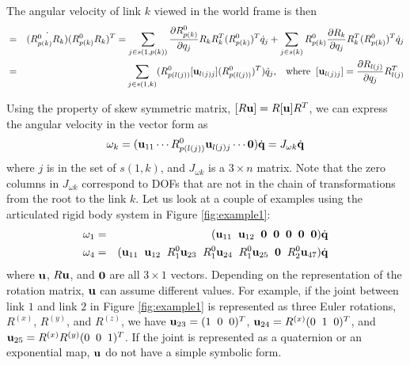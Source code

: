 The angular velocity of link $k$ viewed in the world frame is then
\begin{eqnarray}
[\omega_k] & = & \dot{(R^0_{p(k)}R_k)} (R^0_{p(k)}R_k)^T = \sum_{j \in s(1,p(k))}
\frac{\partial R^0_{p(k)}}{\partial q_j} R_k R_k^T (R^0_{p(k)})^T
\dot{q}_j + \sum_{j \in s(k)} R^0_{p(k)} \frac{\partial R_k}{\partial q_j} R_k^T
(R^0_{p(k)})^T \dot{q}_j  \nonumber \\
& = & \sum_{j \in s(1,k)} (R^0_{p(l(j))} [\vc{u}_{l(j)j}] (R^0_{p(l(j))})^T) \dot{q}_j, \;\;\;\mathrm{where}\;\;
[\vc{u}_{l(j)j}] = \frac{\partial R_{l(j)}}{\partial q_j} R_{l(j)}^T
\end{eqnarray}

Using the property of skew symmetric matrix, $[R \mathbf{u}] = R [\mathbf{u}]
R^T$, we can express the angular velocity in the vector form as
\begin{equation}
\label{eqn:angular_velocity}
\omega_k = (\mathbf{u}_{11} \cdots R^0_{p(l(j))} \mathbf{u}_{l(j)j} \cdots \mathbf{0}) \dot{\mathbf{q}} = J_{\omega k} \dot{\mathbf{q}}
\end{equation}
where $j$ is in the set of $s(1,k)$, and $J_{\omega k}$ is a $3 \times
n$ matrix. Note that the zero columns in $J_{\omega k}$ correspond to
DOFs that are not in the chain of transformations from the root to the
link $k$. Let us look at a couple of examples using the articulated
rigid body system in Figure \ref{fig:example1}:
\begin{eqnarray}
\omega_1 &=& (\mathbf{u}_{11} \;\; \mathbf{u}_{12} \;\; \mathbf{0}
\;\;\mathbf{0}\;\;\mathbf{0}\;\;\mathbf{0}\;\;\mathbf{0}) \dot{\mathbf{q}}  \nonumber \\
\omega_4 &=& (\mathbf{u}_{11} \;\; \mathbf{u}_{12} \;\; R^0_1\mathbf{u}_{23} \;\;
R^0_1\mathbf{u}_{24} \;\;  R^0_1\mathbf{u}_{25} \;\; \mathbf{0} \;\;
R^0_2 \mathbf{u}_{47}) \dot{\mathbf{q}} \nonumber
\end{eqnarray}
where $\mathbf{u}$, $R\mathbf{u}$, and $\mathbf{0}$ are all $3\times 1$
vectors. Depending on the representation of the rotation matrix,
$\mathbf{u}$ can assume different values. For example, if the joint
between link $1$ and link $2$ in Figure \ref{fig:example1} is
represented as three Euler rotations, $R^{(x)}$, $R^{(y)}$, and
$R^{(z)}$, we have $\mathbf{u}_{23} = (1\;\; 0 \;\; 0)^T$, $\mathbf{u}_{24} =
R^{(x)} (0\;\;1\;\;0)^T$, and $\mathbf{u}_{25} = R^{(x)}R^{(y)}
(0\;\;0\;\;1)^T$. If the joint is represented as a quaternion or an
exponential map, $\mathbf{u}$ do not have a simple symbolic form.


